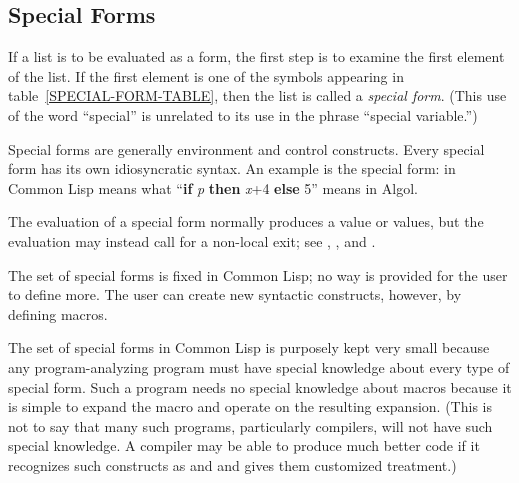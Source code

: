 \subsection{Special Forms}

If a list is to be evaluated as a form, the first step is to examine
the first element of the list.  If the first element is one of
the symbols appearing in table~\ref{SPECIAL-FORM-TABLE},
then the list is called a {\it special form}.  (This use of the word
``special'' is unrelated to its use in the phrase ``special variable.'')

Special forms are generally environment and control constructs.
Every special form has its own idiosyncratic syntax.  An example
is the  special form:
 in Common Lisp means what
``{\bf if} {\it p} {\bf then} {\it x}+4 {\bf else} 5'' means in Algol.

The evaluation of a special form normally produces a value or values,
but the evaluation may instead call for a non-local exit; see ,
, and .

The set of special forms is fixed in Common Lisp; no way is provided
for the user to define more.  The user can create new syntactic
constructs, however, by defining macros.

The set of special forms in Common Lisp is purposely kept very small
because any program-analyzing program must have special knowledge
about every type of special form.  Such a program needs no special
knowledge about macros because it is simple to expand the macro
and operate on the resulting expansion.  (This is not to say that
many such programs, particularly compilers, will not have such
special knowledge.  A compiler may be able
to produce much better code if it recognizes such constructs
as  and  and gives them customized
treatment.)

